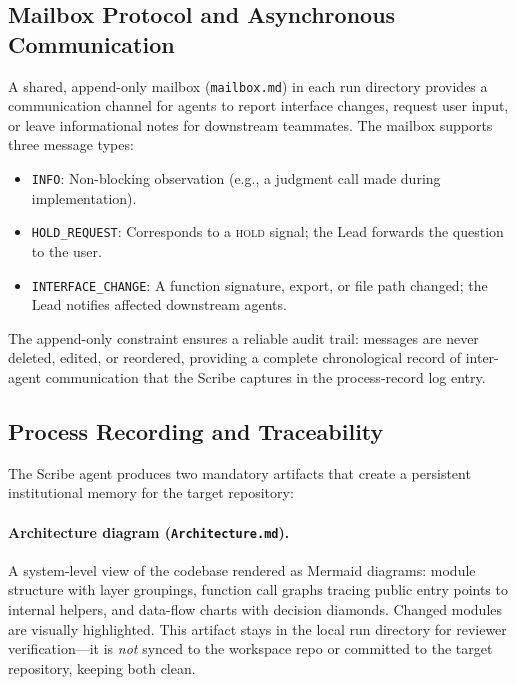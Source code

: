 \subsection{Mailbox Protocol and Asynchronous Communication}
\label{sec:mailbox}

A shared, append-only mailbox (\texttt{mailbox.md}) in each run
directory provides a communication channel for agents to report
interface changes, request user input, or leave informational notes
for downstream teammates. The mailbox supports three message types:

\begin{itemize}[leftmargin=*,itemsep=2pt]
  \item \texttt{INFO}: Non-blocking observation (e.g., a judgment
    call made during implementation).
  \item \texttt{HOLD\_REQUEST}: Corresponds to a \textsc{hold}
    signal; the Lead forwards the question to the user.
  \item \texttt{INTERFACE\_CHANGE}: A function signature, export, or
    file path changed; the Lead notifies affected downstream agents.
\end{itemize}

\noindent
The append-only constraint ensures a reliable audit trail: messages
are never deleted, edited, or reordered, providing a complete
chronological record of inter-agent communication that the Scribe
captures in the process-record log entry.


\subsection{Process Recording and Traceability}
\label{sec:recording}

The Scribe agent produces two mandatory artifacts that create a
persistent institutional memory for the target repository:

\paragraph{Architecture diagram (\texttt{Architecture.md}).}
A system-level view of the codebase rendered as Mermaid diagrams:
module structure with layer groupings, function call graphs tracing
public entry points to internal helpers, and data-flow charts with
decision diamonds. Changed modules are visually highlighted. This
artifact stays in the local run directory for reviewer verification---it
is \emph{not} synced to the workspace repo or committed to the target
repository, keeping both clean.

